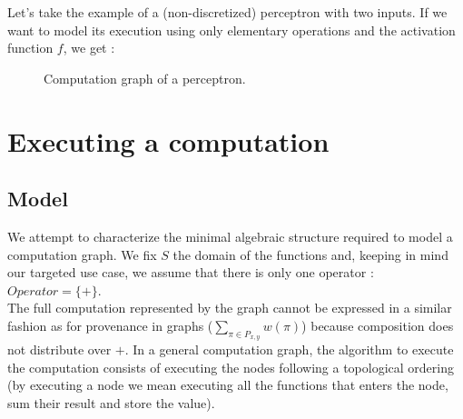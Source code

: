 \documentclass[11pt,a4paper]{article}
\begin{document}
	Let's take the example of a (non-discretized) perceptron with two inputs. If we want to model its execution using only elementary operations and the activation function $f$, we get :
	
	\begin{figure}[!h]
\label{fig:graph_calc_execution}
\centering
{}
\caption{Computation graph of a perceptron.}
\end{figure}


\section{Executing a computation}

\subsection{Model}

We attempt to characterize the minimal algebraic structure required to model a computation graph. We fix $S$ the domain of the functions and, keeping in mind our targeted use case, we assume that there is only one operator : $Operator = \{ + \}$.
\\

The full computation represented by the graph cannot be expressed in a similar fashion as for provenance in graphs ($\underset{\pi \in P_{x,y}}{\sum} w(\pi)$) because composition does not distribute over $+$. In a general computation graph, the algorithm to execute the computation consists of executing the nodes following a topological ordering (by executing a node we mean executing all the functions that enters the node, sum their result and store the value).
\end{document}
